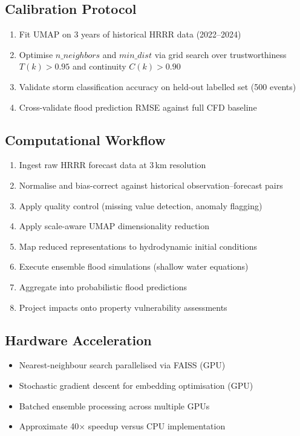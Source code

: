 \documentclass{article}
\begin{document}
\subsection{Calibration Protocol}
\begin{enumerate}[nosep]
    \item Fit UMAP on 3 years of historical HRRR data (2022--2024)
    \item Optimise $n\_neighbors$ and $min\_dist$ via grid search over trustworthiness
          $T(k) > 0.95$ and continuity $C(k) > 0.90$
    \item Validate storm classification accuracy on held-out labelled set (500 events)
    \item Cross-validate flood prediction RMSE against full CFD baseline
\end{enumerate}

\mkmimplementation

\subsection{Computational Workflow}
\begin{enumerate}[nosep]
    \item Ingest raw HRRR forecast data at 3\,km resolution
    \item Normalise and bias-correct against historical observation--forecast pairs
    \item Apply quality control (missing value detection, anomaly flagging)
    \item Apply scale-aware UMAP dimensionality reduction
    \item Map reduced representations to hydrodynamic initial conditions
    \item Execute ensemble flood simulations (shallow water equations)
    \item Aggregate into probabilistic flood predictions
    \item Project impacts onto property vulnerability assessments
\end{enumerate}

\subsection{Hardware Acceleration}
\begin{itemize}[nosep]
    \item Nearest-neighbour search parallelised via FAISS (GPU)
    \item Stochastic gradient descent for embedding optimisation (GPU)
    \item Batched ensemble processing across multiple GPUs
    \item Approximate 40$\times$ speedup versus CPU implementation
\end{itemize}
\end{document}
